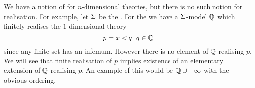 \begin{eg}
    We have a notion of  
    for $n$-dimensional theories,
    but there is no such notion for realisation.
    For example, let $\Sigma$ be the 
    .
    For the 
     we have a $\Sigma$-model 
    $\mathbb{Q}$ which finitely realises the $1$-dimensional theory
    \[p = {x < q \,|\, q \in \mathbb{Q}}\]
    since any finite set has an infemum.
    However there is no element of $\mathbb{Q}$ realising $p$.
    We will  
    see that finite realisation of $p$ 
    implies existence of an elementary extension of $\mathbb{Q}$ realising $p$.
    An example of this would be $\mathbb{Q} \cup {-\infty}$ with the obvious ordering.
\end{eg}

